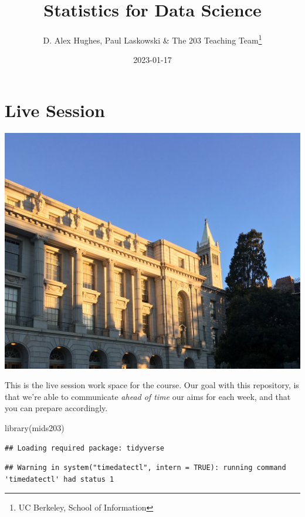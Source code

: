 \documentclass[
]{book}
\title{Statistics for Data Science}
\author{D. Alex Hughes, Paul Laskowski \& The 203 Teaching Team\footnote{UC Berkeley, School of Information}}
\date{2023-01-17}
\newenvironment{Shaded}{\begin{snugshade}}{\end{snugshade}}
\newcommand{\FunctionTok}[1]{\textcolor[rgb]{0.00,0.00,0.00}{#1}}
\newcommand{\NormalTok}[1]{#1}
\theoremstyle{definition}
\theoremstyle{definition}
\theoremstyle{definition}
\theoremstyle{definition}
\theoremstyle{remark}
\begin{document}
\maketitle

{
\setcounter{tocdepth}{1}
\tableofcontents
}
\hypertarget{live-session}{%
\chapter*{Live Session}\label{live-session}}

\includegraphics{./images/campus.jpeg}

This is the live session work space for the course. Our goal with this repository, is that we're able to communicate \emph{ahead of time} our aims for each week, and that you can prepare accordingly.

\begin{Shaded}
\begin{Highlighting}[]
\FunctionTok{library}\NormalTok{(mids203)}
\end{Highlighting}
\end{Shaded}

\begin{verbatim}
## Loading required package: tidyverse
\end{verbatim}

\begin{verbatim}
## Warning in system("timedatectl", intern = TRUE): running command 'timedatectl' had status 1
\end{verbatim}
\end{document}
